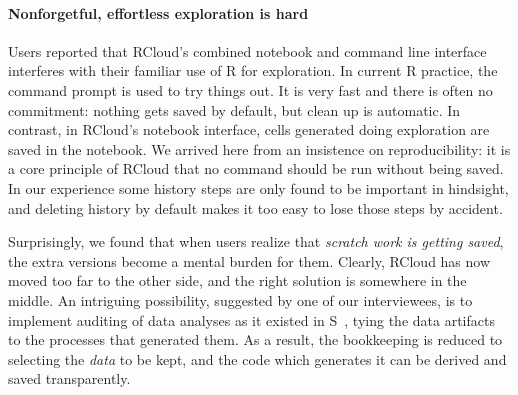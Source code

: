 \paragraph*{Nonforgetful, effortless exploration is hard}
Users reported that RCloud's combined notebook and command line
interface interferes with their familiar use of R for exploration.  In
current R practice, the command prompt is used to try things out.  It
is very fast and there is often no commitment: nothing gets saved by
default, but clean up is automatic.  In contrast, in RCloud's
notebook interface, cells generated doing exploration are saved in the
notebook.  We arrived here from an insistence on reproducibility: it is a
core principle of RCloud that no command should be run without being
saved. In our experience some history steps are only found to be
important in hindsight, and deleting history by default makes it too
easy to lose those steps by accident.

Surprisingly, we found that when users realize that \emph{scratch work
  is getting saved}, the extra versions become a mental burden for
them. Clearly, RCloud has now moved too far to the other side, and the
right solution is somewhere in the middle. An intriguing possibility,
suggested by one of our interviewees, is to implement auditing of data
analyses as it existed in S~\cite{Becker:1988:Auditing}, tying the
data artifacts to the processes that generated them. As a result, the
bookkeeping is reduced to selecting the \emph{data} to be kept, and
the code which generates it can be derived and saved transparently.



